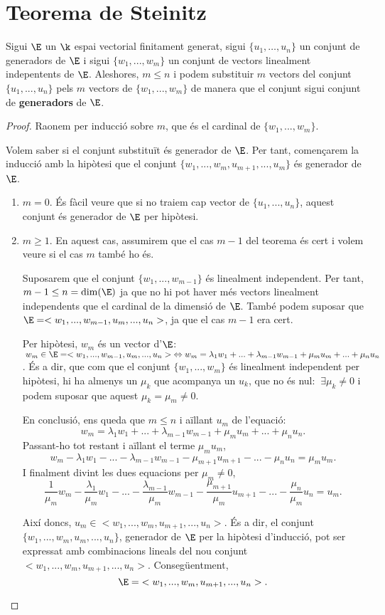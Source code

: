 \section{Teorema de Steinitz}
Sigui $\E$ un $\k$ espai vectorial finitament generat, sigui $\{u_1,\dots, u_n\}$ un conjunt de generadors de $\E$ i sigui $\{w_1,..., w_m\}$ un conjunt de vectors linealment indepentents de $\E$. Aleshores, $m \leq n$ i podem substituir $m$ vectors del conjunt $\{u_1, ..., u_n\}$ pels $m$ vectors de $\{w_1,..., w_m\}$ de manera que el conjunt sigui conjunt de \textbf{generadors} de $\E$.
\\

\begin{proof}
Raonem per inducció sobre $m$, que és el cardinal de $\{w_1,..., w_m\}$.

Volem saber si el conjunt substituït és generador de $\E$. Per tant, començarem la inducció amb la hipòtesi que el conjunt $\{w_1,..., w_m, u_{m+1}, ..., u_m\}$ és generador de $\E$.
\begin{enumerate}[(1)]
\item $m = 0$.
És fàcil veure que si no traiem cap vector de $\{u_1,..., u_n\}$, aquest conjunt és generador de $\E$ per hipòtesi.

\item $m \geq 1$. 
En aquest cas, assumirem que el cas $m-1$ del teorema és cert i volem veure si el cas $m$ també ho és.

Suposarem que el conjunt $\{w_1,..., w_{m-1}\}$ és linealment independent. Per tant, $m-1 \leq n = \dim(\E)$ ja que no hi pot haver més vectors linealment independents que el cardinal de la dimensió de $\E$. També podem suposar que $\E = <w_1,...,w_{m-1},u_m,...,u_n>$, ja que el cas $m-1$ era cert.

Per hipòtesi, $w_m$ és un vector d'$\E$: $\:w_m \in \E = <w_1,...,w_{m-1},u_m,...,u_n> \;\Leftrightarrow  w_m = \lambda_1 w_1 + ... + \lambda_{m-1}w_{m-1} + \mu_mu_m + ... + \mu_nu_n$. És a dir, que com que el conjunt $\{w_1,..., w_m\}$ és linealment independent per hipòtesi, hi ha almenys un $\mu_k$ que acompanya un $u_k$, que no és nul: $\:\exists\mu_k \neq 0$ i podem suposar que aquest $\mu_k = \mu_m \neq 0$.

En conclusió, ens queda que $m \leq n$ i aïllant $u_m$ de l'equació:
\[
w_m = \lambda_1w_1 + ... + \lambda_{m-1}w_{m-1} + \mu_mu_m + ... + \mu_nu_n.
\]
Passant-ho tot restant i aïllant el terme $\mu_mu_m$,
\[
w_m - \lambda_1w_1 - ... - \lambda_{m-1}w_{m-1} - \mu_{m+1}u_{m+1} - ... - \mu_nu_n = \mu_mu_m.
\]
I finalment divint les dues equacions per $\mu_m \neq 0$,
\[
\frac{1}{\mu_m}w_m - \frac{\lambda_1}{\mu_m}w_1 - ... - \frac{\lambda_{m-1}}{\mu_m}w_{m-1} - \frac{\mu_{m+1}}{\mu_m}u_{m+1} - ... - \frac{\mu_n}{\mu_m}u_n = u_m.
\]

Així doncs, $u_m \in <w_1,...,w_m,u_{m+1},...,u_n>$. És a dir, el conjunt $\{w_1,...,w_m,u_{m},...,u_n\}$, generador de $\E$ per la hipòtesi d'inducció, pot ser expressat amb combinacions lineals del nou conjunt $<w_1,...,w_m,u_{m+1},...,u_n>$. Consegüentment, 
\[
\E = \;<w_1,...,w_m,u_{m+1},...,u_n>.
\]
\end{enumerate}
\end{proof}

